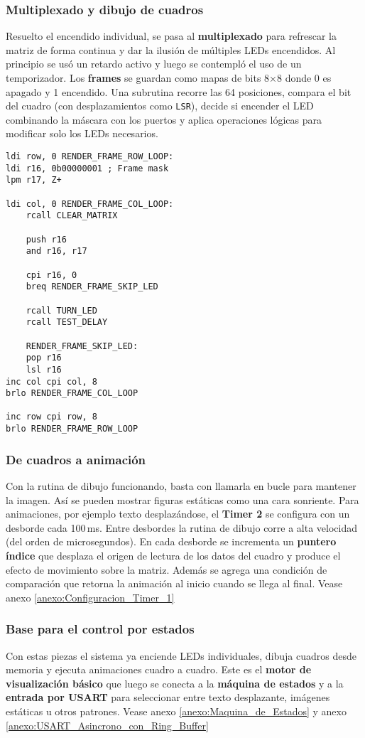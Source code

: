 \subsubsection{Multiplexado y dibujo de cuadros}
Resuelto el encendido individual, se pasa al \textbf{multiplexado} para refrescar la matriz de forma continua y dar la ilusión de múltiples LEDs encendidos. Al principio se usó un retardo activo y luego se contempló el uso de un temporizador. Los \textbf{frames} se guardan como mapas de bits 8×8 donde 0 es apagado y 1 encendido. Una subrutina recorre las 64 posiciones, compara el bit del cuadro (con desplazamientos como \texttt{LSR}), decide si encender el LED combinando la máscara con los puertos y aplica operaciones lógicas para modificar solo los LEDs necesarios.

\begin{verbatim}
ldi row, 0 RENDER_FRAME_ROW_LOOP:  
ldi r16, 0b00000001 ; Frame mask
lpm r17, Z+

ldi col, 0 RENDER_FRAME_COL_LOOP:
    rcall CLEAR_MATRIX

    push r16
    and r16, r17

    cpi r16, 0 
    breq RENDER_FRAME_SKIP_LED

    rcall TURN_LED
    rcall TEST_DELAY

    RENDER_FRAME_SKIP_LED:
    pop r16
    lsl r16
inc col cpi col, 8 
brlo RENDER_FRAME_COL_LOOP 

inc row cpi row, 8 
brlo RENDER_FRAME_ROW_LOOP
\end{verbatim}

\subsubsection{De cuadros a animación}
Con la rutina de dibujo funcionando, basta con llamarla en bucle para mantener la imagen. Así se pueden mostrar figuras estáticas como una cara sonriente. Para animaciones, por ejemplo texto desplazándose, el \textbf{Timer 2} se configura con un desborde cada 100\,ms. Entre desbordes la rutina de dibujo corre a alta velocidad (del orden de microsegundos). En cada desborde se incrementa un \textbf{puntero índice} que desplaza el origen de lectura de los datos del cuadro y produce el efecto de movimiento sobre la matriz. Además se agrega una condición de comparación que retorna la animación al inicio cuando se llega al final. Vease anexo \ref{anexo:Configuracion_Timer_1}


\subsubsection{Base para el control por estados}
Con estas piezas el sistema ya enciende LEDs individuales, dibuja cuadros desde memoria y ejecuta animaciones cuadro a cuadro. Este es el \textbf{motor de visualización básico} que luego se conecta a la \textbf{máquina de estados} y a la \textbf{entrada por USART} para seleccionar entre texto desplazante, imágenes estáticas u otros patrones. Vease anexo \ref{anexo:Maquina_de_Estados} y anexo \ref{anexo:USART_Asincrono_con_Ring_Buffer}


